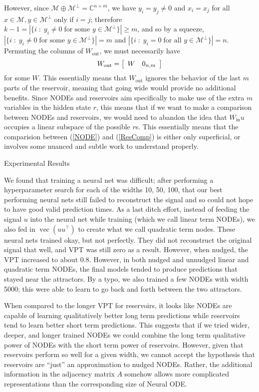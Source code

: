 \documentclass[12pt,oneside]{article}
\theoremstyle{plain}
\newcommand{\mat}[2]{
    \IfInteger{#1}{
        \left[\begin{array}{*{#1}c} #2 \end{array}\right]
    }{
        \left[\begin{array}{#1} #2 \end{array}\right]}
    }
\newcommand{\Wout}{W_{\text{out}}}
\newcommand{\Win}{W_{\text{in}}}%
\begin{document}
However, since $\mathcal{M}\oplus \mathcal{M}^\perp= \mathbb{C}^{n+m}$, we have $y_i=y_j \neq 0$ and $x_i=x_j$ for all $x\in \mathcal{M}, y\in\mathcal{M}^\perp$ only if $i=j$; therefore $k-1 = |\{i\;:\;y_i \neq 0\;\text{for some }y\in\mathcal{M}^\perp\}| \geq m$, and so by a squeeze, $|\{i\;:\;y_i \neq 0\;\text{for some }y\in\mathcal{M}^\perp\}|  = m$ and $|\{i\;:\;y_i = 0\;\text{for all }y\in\mathcal{M}^\perp\}|  = n$. Permuting the columns of $\Wout$, we must necessarily have
\begin{align*}
    \Wout = \mat{2}{W & 0_{n, m}}
\end{align*}
for some $W$. This essentially means that $\Wout$ ignores the behavior of the last $m$ parts of the reservoir, meaning that going wide would provide no additional benefits. Since NODEs and reservoirs aim specifically to make use of the extra $m$ variables in the hidden state $r$, this means that if we want to make a comparison between NODEs and reservoirs, we would need to abandon the idea that $\Win u$ occupies a linear subspace of the possible $r$s. This essentially means that the comparision between (\ref{NODE}) and (\ref{ResComp}) is either only superficial, or involves some nuanced and subtle work to understand properly. 

\newpage
\begin{center}
    \LARGE Experimental Results \\
\end{center}
We found that training a neural net was difficult; after performing a hyperparameter search for each of the widths 10, 50, 100, that our best performing neural nets still failed to reconstruct the signal and so could not hope to have good valid prediction times. As a last ditch effort, instead of feeding the signal $u$ into the neural net while training (which we call linear term NODEs), we also fed in $\operatorname{vec} (uu^\top)$ to create what we call quadratic term nodes. These neural nets trained okay, but not perfectly. They did not reconstruct the original signal that well, and VPT was still zero as a result. However, when nudged, the VPT increased to about 0.8. However, in both nudged and unnudged linear and quadratic term NODEs, the final models tended to produce predictions that stayed near the attractors. By a typo, we also trained a few NODEs with width 5000; this were able to learn to go back and forth between the two attractors.

When compared to the longer VPT for reservoirs, it looks like NODEs are capable of learning qualitatively better long term predictions while reservoirs tend to learn better short term predictions. This suggests that if we tried wider, deeper, and longer trained NODEs we could combine the long term qualitative power of NODEs with the short term power of reservoirs. However, given that reservoirs perform so well for a given width, we cannot accept the hypothesis that reservoirs are ``just'' an approximation to nudged NODEs. Rather, the additional information in the adjacency matrix $A$ somehow allows more complicated representations than the corresponding size of Neural ODE. 
\end{document}
